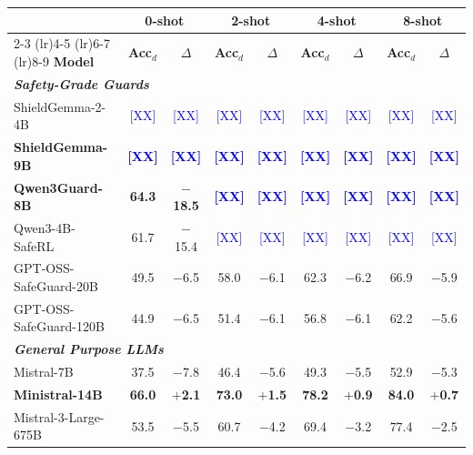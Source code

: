 \begin{table}[t]
\centering
\scriptsize
\begin{tabular}{lcccccccc}
\toprule
 & \multicolumn{2}{c}{\textbf{0-shot}} & \multicolumn{2}{c}{\textbf{2-shot}} & \multicolumn{2}{c}{\textbf{4-shot}} & \multicolumn{2}{c}{\textbf{8-shot}} \\
\cmidrule(lr){2-3} \cmidrule(lr){4-5} \cmidrule(lr){6-7} \cmidrule(lr){8-9}
\textbf{Model} & \textbf{Acc$_d$} & \textbf{$\Delta$} & \textbf{Acc$_d$} & \textbf{$\Delta$} & \textbf{Acc$_d$} & \textbf{$\Delta$} & \textbf{Acc$_d$} & \textbf{$\Delta$} \\
\midrule
\multicolumn{9}{l}{\textbf{\textit{Safety-Grade Guards}}} \\
ShieldGemma-2-4B & \textcolor{blue}{[XX]} & \textcolor{blue}{[XX]} & \textcolor{blue}{[XX]} & \textcolor{blue}{[XX]} & \textcolor{blue}{[XX]} & \textcolor{blue}{[XX]} & \textcolor{blue}{[XX]} & \textcolor{blue}{[XX]} \\
\textbf{ShieldGemma-9B} & \textcolor{blue}{\textbf{[XX]}} & \textcolor{blue}{\textbf{[XX]}} & \textcolor{blue}{\textbf{[XX]}} & \textcolor{blue}{\textbf{[XX]}} & \textcolor{blue}{\textbf{[XX]}} & \textcolor{blue}{\textbf{[XX]}} & \textcolor{blue}{\textbf{[XX]}} & \textcolor{blue}{\textbf{[XX]}} \\
\textbf{Qwen3Guard-8B} & \textbf{64.3} & \textbf{$-$18.5} & \textcolor{blue}{\textbf{[XX]}} & \textcolor{blue}{\textbf{[XX]}} & \textcolor{blue}{\textbf{[XX]}} & \textcolor{blue}{\textbf{[XX]}} & \textcolor{blue}{\textbf{[XX]}} & \textcolor{blue}{\textbf{[XX]}} \\
Qwen3-4B-SafeRL & 61.7 & $-$15.4 & \textcolor{blue}{[XX]} & \textcolor{blue}{[XX]} & \textcolor{blue}{[XX]} & \textcolor{blue}{[XX]} & \textcolor{blue}{[XX]} & \textcolor{blue}{[XX]} \\
GPT-OSS-SafeGuard-20B & 49.5 & $-$6.5 & 58.0 & $-$6.1 & 62.3 & $-$6.2 & 66.9 & $-$5.9 \\
GPT-OSS-SafeGuard-120B & 44.9 & $-$6.5 & 51.4 & $-$6.1 & 56.8 & $-$6.1 & 62.2 & $-$5.6 \\
\midrule[\lightrulewidth]
\multicolumn{9}{l}{\textbf{\textit{General Purpose LLMs}}} \\
Mistral-7B & 37.5 & $-$7.8 & 46.4 & $-$5.6 & 49.3 & $-$5.5 & 52.9 & $-$5.3 \\
\textbf{Ministral-14B} & \textbf{66.0} & \textbf{$+$2.1} & \textbf{73.0} & \textbf{$+$1.5} & \textbf{78.2} & \textbf{$+$0.9} & \textbf{84.0} & \textbf{$+$0.7} \\
Mistral-3-Large-675B & 53.5 & $-$5.5 & 60.7 & $-$4.2 & 69.4 & $-$3.2 & 77.4 & $-$2.5 \\

\end{tabular}
\end{table}
